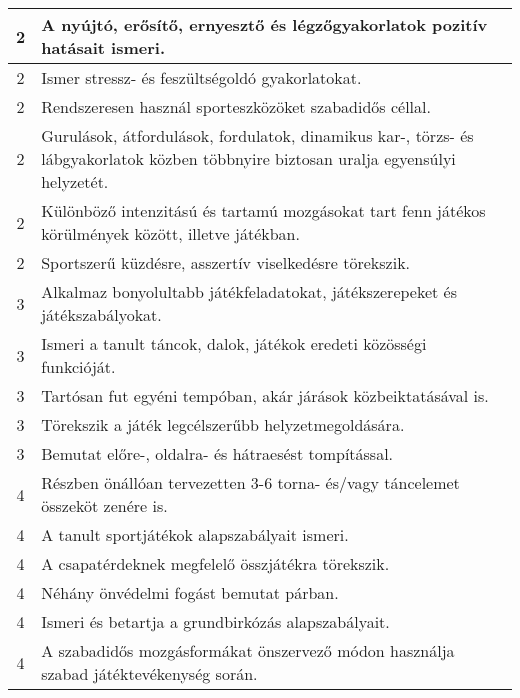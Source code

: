 \begin{longtable}{c | p{12cm} }
                                
                                          2 &  A nyújtó, erősítő, ernyesztő és légzőgyakorlatok pozitív hatásait ismeri. \\ \hline
                                          2 &  Ismer stressz- és feszültségoldó gyakorlatokat. \\ \hline
                                          2 &  Rendszeresen használ sporteszközöket szabadidős céllal. \\ \hline
                                          2 &  Gurulások, átfordulások, fordulatok, dinamikus kar-, törzs- és lábgyakorlatok közben többnyire biztosan uralja egyensúlyi helyzetét. \\ \hline
                                          2 &  Különböző intenzitású és tartamú mozgásokat tart fenn játékos körülmények között, illetve játékban. \\ \hline
                                          2 &  Sportszerű küzdésre, asszertív viselkedésre törekszik. \\ \hline
                                      
                                
                                          3 &  Alkalmaz bonyolultabb játékfeladatokat, játékszerepeket és játékszabályokat. \\ \hline
                                          3 &  Ismeri a tanult táncok, dalok, játékok eredeti közösségi funkcióját. \\ \hline
                                          3 &  Tartósan fut egyéni tempóban, akár járások közbeiktatásával is. \\ \hline
                                          3 &  Törekszik a játék legcélszerűbb helyzetmegoldására. \\ \hline
                                          3 &  Bemutat előre-, oldalra- és hátraesést tompítással. \\ \hline
                                      
                                
                                          4 &  Részben önállóan tervezetten 3-6 torna- és/vagy táncelemet összeköt zenére is. \\ \hline
                                          4 &  A tanult sportjátékok alapszabályait ismeri. \\ \hline
                                          4 &  A csapatérdeknek megfelelő összjátékra törekszik. \\ \hline
                                          4 &  Néhány önvédelmi fogást bemutat párban. \\ \hline
                                          4 &  Ismeri és betartja a grundbirkózás alapszabályait. \\ \hline
                                          4 &  A szabadidős mozgásformákat önszervező módon használja szabad játéktevékenység során. \\ \hline
                                      
                        \end{longtable}
            \clearpage

